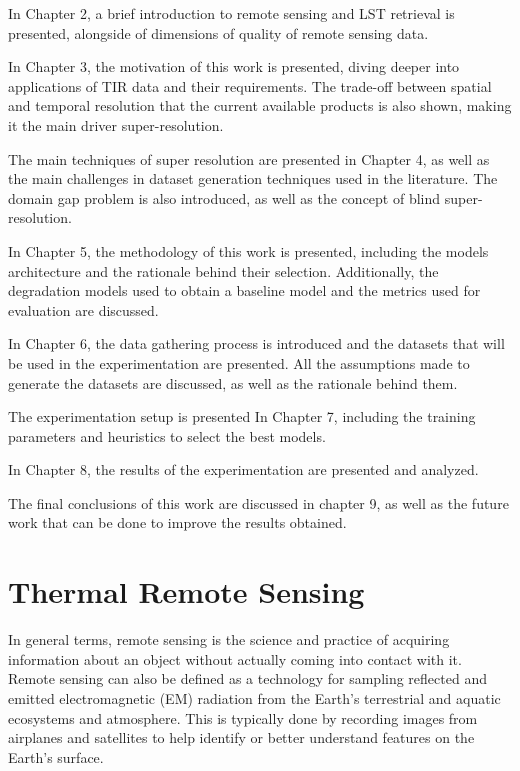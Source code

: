 In Chapter 2, a brief introduction to remote sensing and LST retrieval is presented, alongside of dimensions of quality of remote sensing data.

In Chapter 3, the motivation of this work is presented, diving deeper into applications of TIR data and their requirements.
The trade-off between spatial and temporal resolution that the current available products is also shown, making it the main driver super-resolution.

The main techniques of super resolution are presented in Chapter 4, as well as the main challenges in dataset generation techniques used in the literature.
The domain gap problem is also introduced, as well as the concept of blind super-resolution.

In Chapter 5, the methodology of this work is presented, including the models architecture and the rationale behind their selection. Additionally, the degradation models used to obtain a baseline model and the metrics used for evaluation are discussed.

In Chapter 6, the data gathering process is introduced and the datasets that will be used in the experimentation are presented. All the assumptions made to generate the datasets are discussed, as well as the rationale behind them.

The experimentation setup is presented In Chapter 7, including the training parameters and heuristics to select the best models.

In Chapter 8, the results of the experimentation are presented and analyzed.

The final conclusions of this work are discussed in chapter 9, as well as the future work that can be done to improve the results obtained.

\newpage
    
\section{Thermal Remote Sensing} \label{sec:thermal_remote_sensing}

In general terms, remote sensing is the science and practice of acquiring information about an object without actually coming into contact with it.
Remote sensing can also be defined as a technology for sampling reflected and emitted electromagnetic (EM) radiation from the Earth’s terrestrial and aquatic ecosystems and atmosphere.
This is typically done by recording images from airplanes and satellites to help identify or better understand features on the Earth’s surface.

